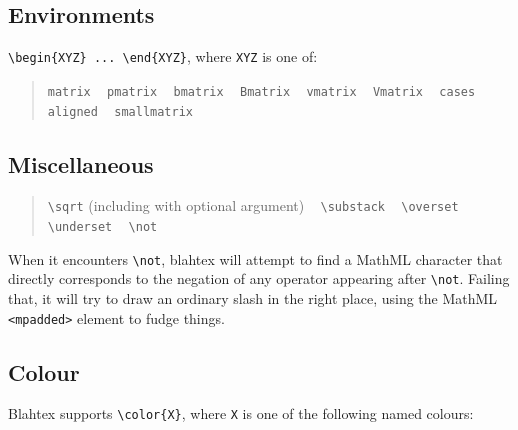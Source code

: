 \documentclass{article}
\newcommand{\texcommand}[1]{\textbackslash{}#1}
\newcommand{\spacer}{\,\,\, \hfil}
\newcommand{\lastspacer}{\hfill\hfill\hfill}
\newenvironment{mylist}{\begin{quote}}{\end{quote}}
\begin{document}
\subsection{Environments}

\texttt{\texcommand{begin}\{XYZ\} ... \texcommand{end}\{XYZ\}}, where \texttt{XYZ} is one of: 

\begin{mylist}
\texttt{matrix} \spacer
\texttt{pmatrix} \spacer
\texttt{bmatrix} \spacer
\texttt{Bmatrix} \spacer
\texttt{vmatrix} \spacer
\texttt{Vmatrix} \spacer
\texttt{cases} \spacer
\texttt{aligned} \spacer
\texttt{smallmatrix} \lastspacer
\end{mylist}

\subsection{Miscellaneous}

\begin{mylist}
\texttt{\texcommand{sqrt}} (including with optional argument) \spacer
\texttt{\texcommand{substack}} \spacer
\texttt{\texcommand{overset}} \spacer
\texttt{\texcommand{underset}} \spacer
\texttt{\texcommand{not}} \lastspacer
\end{mylist}

When it encounters \texttt{\texcommand{not}}, blahtex will attempt to find a MathML character that directly corresponds to the negation of any operator appearing after \texttt{\texcommand{not}}. Failing that, it will try to draw an ordinary slash in the right place, using the MathML \texttt{<mpadded>} element to fudge things.

\subsection{Colour}

Blahtex supports \texttt{\texcommand{color}\{X\}}, where \texttt{X} is one of the following named colours:
\end{document}
